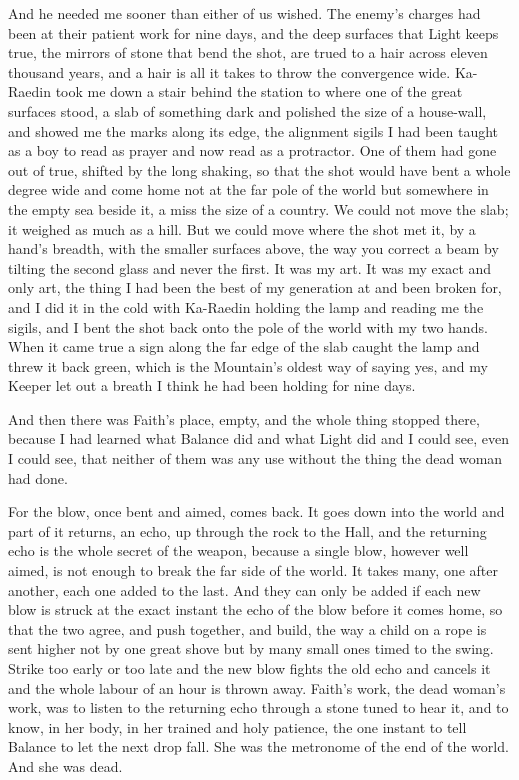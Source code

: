And he needed me sooner than either of us wished. The enemy's charges had been at their patient work for nine days, and the deep surfaces that Light keeps true, the mirrors of stone that bend the shot, are trued to a hair across eleven thousand years, and a hair is all it takes to throw the convergence wide. Ka-Raedin took me down a stair behind the station to where one of the great surfaces stood, a slab of something dark and polished the size of a house-wall, and showed me the marks along its edge, the alignment sigils I had been taught as a boy to read as prayer and now read as a protractor. One of them had gone out of true, shifted by the long shaking, so that the shot would have bent a whole degree wide and come home not at the far pole of the world but somewhere in the empty sea beside it, a miss the size of a country. We could not move the slab; it weighed as much as a hill. But we could move where the shot met it, by a hand's breadth, with the smaller surfaces above, the way you correct a beam by tilting the second glass and never the first. It was my art. It was my exact and only art, the thing I had been the best of my generation at and been broken for, and I did it in the cold with Ka-Raedin holding the lamp and reading me the sigils, and I bent the shot back onto the pole of the world with my two hands. When it came true a sign along the far edge of the slab caught the lamp and threw it back green, which is the Mountain's oldest way of saying yes, and my Keeper let out a breath I think he had been holding for nine days.\par

\ornament

And then there was Faith's place, empty, and the whole thing stopped there, because I had learned what Balance did and what Light did and I could see, even I could see, that neither of them was any use without the thing the dead woman had done.\par

For the blow, once bent and aimed, comes back. It goes down into the world and part of it returns, an echo, up through the rock to the Hall, and the returning echo is the whole secret of the weapon, because a single blow, however well aimed, is not enough to break the far side of the world. It takes many, one after another, each one added to the last. And they can only be added if each new blow is struck at the exact instant the echo of the blow before it comes home, so that the two agree, and push together, and build, the way a child on a rope is sent higher not by one great shove but by many small ones timed to the swing. Strike too early or too late and the new blow fights the old echo and cancels it and the whole labour of an hour is thrown away. Faith's work, the dead woman's work, was to listen to the returning echo through a stone tuned to hear it, and to know, in her body, in her trained and holy patience, the one instant to tell Balance to let the next drop fall. She was the metronome of the end of the world. And she was dead.\par


